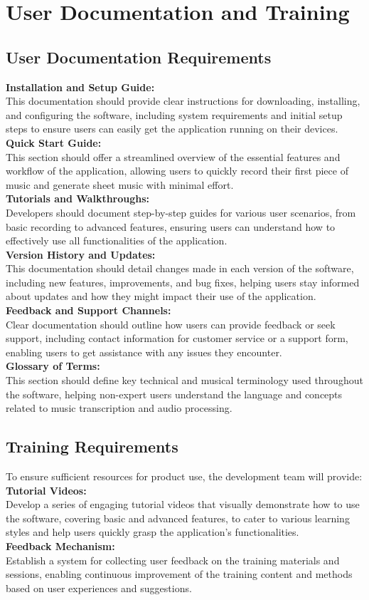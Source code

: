 \documentclass[12pt]{article}
\begin{document}
\section{User Documentation and Training}
\subsection{User Documentation Requirements}
\textbf{Installation and Setup Guide:} \\ This documentation should provide clear instructions for downloading, installing, and configuring the software, including system requirements and initial setup steps to ensure users can easily get the application running on their devices.
\\ 
\textbf{Quick Start Guide:}\\This section should offer a streamlined overview of the essential features and workflow of the application, allowing users to quickly record their first piece of music and generate sheet music with minimal effort.\\
\textbf{Tutorials and Walkthroughs: } \\Developers should document step-by-step guides for various user scenarios, from basic recording to advanced features, ensuring users can understand how to effectively use all functionalities of the application. \\
\textbf{Version History and Updates: }\\ This documentation should detail changes made in each version of the software, including new features, improvements, and bug fixes, helping users stay informed about updates and how they might impact their use of the application. \\
\textbf{Feedback and Support Channels: } \\Clear documentation should outline how users can provide feedback or seek support, including contact information for customer service or a support form, enabling users to get assistance with any issues they encounter. \\
\textbf{Glossary of Terms:}\\ This section should define key technical and musical terminology used throughout the software, helping non-expert users understand the language and concepts related to music transcription and audio processing.
\subsection{Training Requirements}
To ensure sufficient resources for product use, the development team will provide: \\
\textbf{Tutorial Videos:} \\ Develop a series of engaging tutorial videos that visually demonstrate how to use the software, covering basic and advanced features, to cater to various learning styles and help users quickly grasp the application’s functionalities. \\
\textbf{Feedback Mechanism:}\\ Establish a system for collecting user feedback on the training materials and sessions, enabling continuous improvement of the training content and methods based on user experiences and suggestions.
\end{document}
